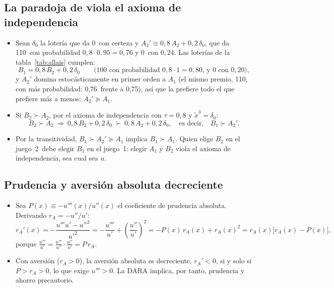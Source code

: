 \documentclass[11pt]{article}
\begin{document}
\subsection{La paradoja de  viola el axioma de independencia}\label{anexo:allais}

\begin{itemize}
\item Sean $\delta_0$ la lotería que da 0~con certeza y $A_2'\equiv 0{,}8\,A_2+0{,}2\,\delta_0$, que da 110~con probabilidad $0{,}8\cdot 0{,}95=0{,}76$ y 0~con $0{,}24$. Las loterías de la tabla~\ref{tab:allais} cumplen:
  $$B_1=0{,}8\,B_2+0{,}2\,\delta_0\qquad\text{(100 con probabilidad } 0{,}8\cdot 1=0{,}80\text{, y 0 con } 0{,}20),$$
  y $A_2'$ domina estocásticamente en primer orden a $A_1$ (el mismo premio, 110, con más probabilidad: 0,76~frente a 0,75), así que la prefiere todo el que prefiere más a menos: $A_2'\succcurlyeq A_1$.
\item Si $B_2\succ A_2$, por el axioma de independencia con $\tau=0{,}8$ y $\tilde{x}^3=\delta_0$:
  $$B_2\succ A_2\ \Longrightarrow\ 0{,}8\,B_2+0{,}2\,\delta_0\ \succ\ 0{,}8\,A_2+0{,}2\,\delta_0,\quad\text{es decir,}\quad B_1\succ A_2' .$$
\item Por la transitividad, $B_1\succ A_2'\succcurlyeq A_1$ implica $B_1\succ A_1$. Quien elige $B_2$ en el juego~2~debe elegir $B_1$ en el juego~1: elegir $A_1$ y $B_2$ viola el axioma de independencia, sea cual sea $u$.
\end{itemize}
\findemo

\subsection{Prudencia y aversión absoluta decreciente}\label{anexo:prudencia}

\begin{itemize}
\item Sea $P(x)\equiv-u'''(x)/u''(x)$ el coeficiente de prudencia absoluta. Derivando $r_A=-u''/u'$:
  $$r_A'(x)=-\frac{u'''u'-u''^2}{u'^2}=-\frac{u'''}{u'}+\left(\frac{u''}{u'}\right)^2=-P(x)\,r_A(x)+r_A(x)^2=r_A(x)\big[r_A(x)-P(x)\big],$$
  porque $\frac{u'''}{u'}=\frac{u'''}{u''}\cdot\frac{u''}{u'}=P\,r_A$.
\item Con aversión ($r_A>0$), la aversión absoluta es decreciente, $r_A'<0$, si y solo si $P>r_A>0$, lo que exige $u'''>0$. La DARA implica, por tanto, prudencia y ahorro precautorio.
\end{itemize}
\findemo

\end{document}

